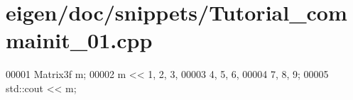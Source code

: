 \hypertarget{eigen_2doc_2snippets_2_tutorial__commainit__01_8cpp_source}{}\section{eigen/doc/snippets/\+Tutorial\+\_\+commainit\+\_\+01.cpp}
\label{eigen_2doc_2snippets_2_tutorial__commainit__01_8cpp_source}

\begin{DoxyCode}
00001 Matrix3f m;
00002 m << 1, 2, 3,
00003      4, 5, 6,
00004      7, 8, 9;
00005 std::cout << m;
\end{DoxyCode}
